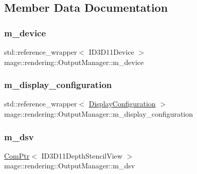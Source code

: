 \subsection{Member Data Documentation}
\hypertarget{classmage_1_1rendering_1_1_output_manager_ad0f8b4613dfbd613576a3c58c8ff4c37}{}\label{classmage_1_1rendering_1_1_output_manager_ad0f8b4613dfbd613576a3c58c8ff4c37} 
\subsubsection{\texorpdfstring{m\+\_\+device}{m\_device}}
{\footnotesize\ttfamily std\+::reference\+\_\+wrapper$<$ I\+D3\+D11\+Device $>$ mage\+::rendering\+::\+Output\+Manager\+::m\+\_\+device\hspace{0.3cm}{\ttfamily [private]}}

\hypertarget{classmage_1_1rendering_1_1_output_manager_a41905bc9eb0426c2e75d33d60bb95fbf}{}\label{classmage_1_1rendering_1_1_output_manager_a41905bc9eb0426c2e75d33d60bb95fbf} 
\subsubsection{\texorpdfstring{m\+\_\+display\+\_\+configuration}{m\_display\_configuration}}
{\footnotesize\ttfamily std\+::reference\+\_\+wrapper$<$ \hyperlink{classmage_1_1rendering_1_1_display_configuration}{Display\+Configuration} $>$ mage\+::rendering\+::\+Output\+Manager\+::m\+\_\+display\+\_\+configuration\hspace{0.3cm}{\ttfamily [private]}}

\hypertarget{classmage_1_1rendering_1_1_output_manager_a48225f5d17db8e3d0e44adc2689d326f}{}\label{classmage_1_1rendering_1_1_output_manager_a48225f5d17db8e3d0e44adc2689d326f} 
\subsubsection{\texorpdfstring{m\+\_\+dsv}{m\_dsv}}
{\footnotesize\ttfamily \hyperlink{namespacemage_ae74f374780900893caa5555d1031fd79}{Com\+Ptr}$<$ I\+D3\+D11\+Depth\+Stencil\+View $>$ mage\+::rendering\+::\+Output\+Manager\+::m\+\_\+dsv\hspace{0.3cm}{\ttfamily [private]}}

